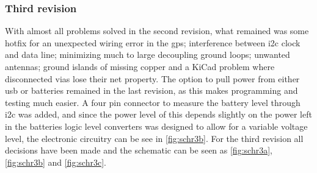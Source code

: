 \subsubsection{Third revision}
With almost all problems solved in the second revision, what remained was some hotfix for an unexpected wiring error in the \gls{gps}; interference between \gls{i2c} clock and data line; minimizing much to large decoupling ground loops; unwanted antennas; ground islands of missing copper and a KiCad problem where disconnected \gls{via}s lose their net property. The option to pull power from either \gls{usb} or batteries remained in the last revision, as this makes programming and testing much easier. A four pin connector to measure the battery level through \gls{i2c} was added, and since the power level of this depends slightly on the power left in the batteries logic level converters was designed to allow for a variable voltage level\cite{llc}, the electronic circuitry can be see in \autoref{fig:schr3b}.
For the third revision all decisions have been made and the schematic can be seen as \autoref{fig:schr3a}, \ref{fig:schr3b} and \ref{fig:schr3c}.

